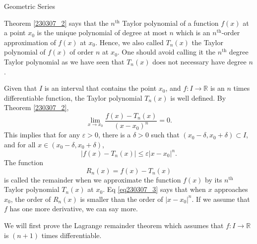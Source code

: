 \begin{example}[label=230305_16]{Geometric Series}
\begin{example}[label=230304_9]{}
\begin{example}{}
\begin{highlight}{}
Theorem \ref{230307_2} says that the $n^{\text{th}}$ Taylor polynomial  of a function $f(x)$ at a point $x_0$ is the unique polynomial of degree at most $n$ which is an $n^{\text{th}}$-order approximation of $f(x)$ at $x_0$. Hence, we also called $T_n(x)$ the Taylor polynomial of $f(x)$ of order $n$ at $x_0$. One should avoid calling it the $n^{\text{th}}$ degree Taylor polynomial as we have seen that $T_n(x)$ does not necessary have degree $n$. 
\end{highlight}

Given that $I$ is an interval that contains the point $x_0$, and  $f:I\to\mathbb{R}$   is an $n$ times differentiable function, the Taylor polynomial $T_n(x)$ is well defined. By Theorem \ref{230307_2},
\[\lim_{x\to x_0}\frac{f(x)-T_n(x)}{(x-x_0)^n}=0.\]
This implies that for any $\varepsilon>0$, there is a $\delta>0$ such that $(x_0-\delta, x_0+\delta)\subset I$, and for all $x\in (x_0-\delta, x_0+\delta)$,
\begin{equation}\label{eq230307_3}|f(x)-T_n(x)|\leq \varepsilon |x-x_0|^n.\end{equation}
The function 
\[R_n(x)=f(x)-T_n(x)\] is called the remainder when we approximate the function $f(x)$ by its $n^{\text{th}}$ Taylor polynomial $T_n(x)$ at $x_0$. Eq \eqref{eq230307_3} says that when $x$ approaches $x_0$, the order of $R_n(x)$ is smaller than the order of $|x-x_0|^n$. If we assume that $f$ has one more derivative, we can   say more. 

We will first prove the Lagrange  remainder theorem which  assumes that $f:I\to\mathbb{R}$ is $(n+1)$ times differentiable.  


\end{example}
\end{example}
\end{example}
